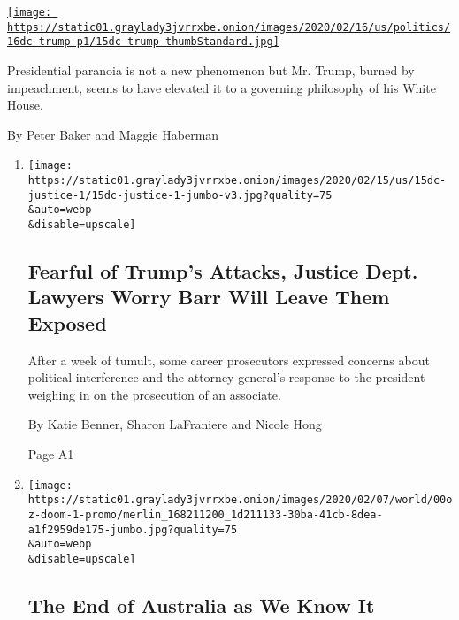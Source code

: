 \begin{enumerate}
\begin{enumerate}
    \href{/2020/02/15/us/politics/trump-distrust-paranoia.html}{\texttt{[image: https://static01.graylady3jvrrxbe.onion/images/2020/02/16/us/politics/16dc-trump-p1/15dc-trump-thumbStandard.jpg]}}

    Presidential paranoia is not a new phenomenon but Mr. Trump, burned
    by impeachment, seems to have elevated it to a governing philosophy
    of his White House.

    By Peter Baker and Maggie Haberman
  \end{enumerate}
\end{enumerate}

\begin{enumerate}
\def\labelenumi{\arabic{enumi}.}
\item
  \href{/2020/02/15/us/politics/trump-barr-justice-department.html}{}

  \texttt{[image: https://static01.graylady3jvrrxbe.onion/images/2020/02/15/us/15dc-justice-1/15dc-justice-1-jumbo-v3.jpg?quality=75\\\&auto=webp\\\&disable=upscale]}

  \hypertarget{fearful-of-trumps-attacks-justice-dept-lawyers-worry-barr-will-leave-them-exposed}{%
  \subsection{Fearful of Trump's Attacks, Justice Dept. Lawyers Worry
  Barr Will Leave Them
  Exposed}\label{fearful-of-trumps-attacks-justice-dept-lawyers-worry-barr-will-leave-them-exposed}}

  After a week of tumult, some career prosecutors expressed concerns
  about political interference and the attorney general's response to
  the president weighing in on the prosecution of an associate.

  By Katie Benner, Sharon LaFraniere and Nicole Hong

  Page A1
\item
  \href{/2020/02/15/world/australia/fires-climate-change.html}{}

  \texttt{[image: https://static01.graylady3jvrrxbe.onion/images/2020/02/07/world/00oz-doom-1-promo/merlin\_168211200\_1d211133-30ba-41cb-8dea-a1f2959de175-jumbo.jpg?quality=75\\\&auto=webp\\\&disable=upscale]}

  \hypertarget{the-end-of-australia-as-we-know-it}{%
  \subsection{The End of Australia as We Know
  It}\label{the-end-of-australia-as-we-know-it}}


\end{enumerate}

